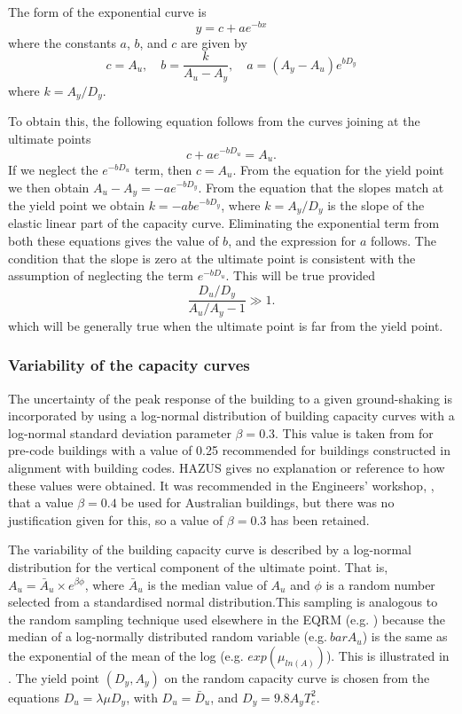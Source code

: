 The form of the exponential curve is
$$
 y = c + a e^{-bx}
$$
where the constants $a$, $b$, and $c$ are given by
\begin{equation}
c = A_u,\quad b = \frac{k}{A_u-A_y}, \quad
a = (A_y-A_u)e^{b D_y}
\end{equation}
where $k = A_y/D_y$.

To obtain this, the following equation follows from the curves
joining at the ultimate points
$$
 c+ae^{-bD_u} = A_u.
$$
If we neglect the $e^{-bD_u}$ term, then $c=A_u$. From the
equation for the yield point we then obtain $A_u-A_y =
-ae^{-bD_y}$. From the equation that the slopes match at the yield
point we obtain $k = -abe^{-bD_y}$, where $k=A_y/D_y$ is the slope
of the elastic linear part of the capacity curve. Eliminating the exponential term from both these equations
gives the value of $b$, and the expression for $a$ follows. The
condition that the slope is zero at the ultimate point is
consistent with the assumption of neglecting the term $e^{-bD_u}$.
This will be true provided
$$
 \frac{D_u/D_y}{A_u/A_y-1} \gg 1.
$$
which will be generally true when the ultimate point is far from the
yield point.


\subsubsection{Variability of the capacity curves}
\label{sec:dam-capacity-var}

The uncertainty of the peak response of the building to a given
ground-shaking is incorporated by using a log-normal distribution
of building capacity curves with a
log-normal standard deviation parameter $\beta=0.3$. This value is
taken from \cite{dr_FEMA99b} for pre-code buildings with a value
of 0.25 recommended for buildings constructed in alignment with
building codes. HAZUS gives no explanation or reference to how
these values were obtained. It was recommended in the Engineers'
workshop, \cite{dr_Stehle01a}, that a value $\beta=0.4$ be used
for Australian buildings, but there was no justification given for
this, so a value of $\beta=0.3$ has been retained.

The variability of the building capacity curve is described by a log-normal distribution for the vertical
component of the ultimate point. That is, $A_u=\bar A_u\times
e^{\beta\phi}$, where $\bar A_u$ is the median value of $A_u$ and
$\phi$ is a random number selected from a standardised normal
distribution.This sampling is
analogous to the random sampling technique used elsewhere in the
EQRM (e.g. ) because the median
 of a log-normally distributed random variable (e.g.$\ bar A_u$) is the
 same as the exponential of the mean of the log (e.g. $exp(\mu_{ln(A)})$).
 This is illustrated in
. The yield point $(D_y, A_y)$
on the random capacity curve is chosen from
the equations $D_u=\lambda\mu D_y$, with $D_u=\bar D_u$, and $D_y
= 9.8A_yT_e^2$.

